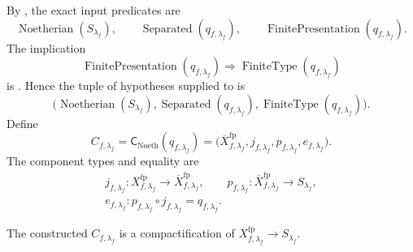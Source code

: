 \begin{definition}
  \label{def:nagata-final-noetherian-compactification}
  \checked{}

  By , the exact input predicates are
  \[
    \operatorname{Noetherian}(S_{\lambda_f}),\qquad
    \operatorname{Separated}(q_{f,\lambda_f}),\qquad
    \operatorname{FinitePresentation}(q_{f,\lambda_f}).           \tag{FNC0}
  \]
  The implication
  \[
    \operatorname{FinitePresentation}(q_{f,\lambda_f})
      \Longrightarrow
    \operatorname{FiniteType}(q_{f,\lambda_f})                    \tag{FNC1}
  \]
  is
  \cite[\href{https://stacks.math.columbia.edu/tag/01TW}{Tag 01TW}]
  {stacks-project}.  Hence the tuple of hypotheses supplied to
   is
  \[
    \bigl(
      \operatorname{Noetherian}(S_{\lambda_f}),
      \operatorname{Separated}(q_{f,\lambda_f}),
      \operatorname{FiniteType}(q_{f,\lambda_f})
    \bigr).                                                        \tag{FNC2}
  \]
  Define
  \[
    C_{f,\lambda_f}
      =\mathsf C_{\mathrm{Noeth}}
        (q_{f,\lambda_f})
      =\bigl(
        \overline X_{f,\lambda_f}^{\mathrm{fp}},
        j_{f,\lambda_f},p_{f,\lambda_f},e_{f,\lambda_f}
        \bigr).
  \]
  The component types and equality are
  \[
  \begin{gathered}
    j_{f,\lambda_f}\colon X_{f,\lambda_f}^{\mathrm{fp}}
      \to\overline X_{f,\lambda_f}^{\mathrm{fp}},\qquad
    p_{f,\lambda_f}\colon\overline X_{f,\lambda_f}^{\mathrm{fp}}
      \to S_{\lambda_f},\\
    e_{f,\lambda_f}\colon
      p_{f,\lambda_f}\circ j_{f,\lambda_f}=q_{f,\lambda_f}.
  \end{gathered}
  \]
\end{definition}

\begin{lemma}
  \label{lemma:nagata-final-noetherian-compactification}
  \checked{}

  The constructed $C_{f,\lambda_f}$ is a compactification of
  $X_{f,\lambda_f}^{\mathrm{fp}}\to S_{\lambda_f}$.
\end{lemma}

